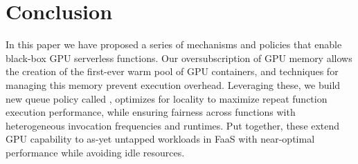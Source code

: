 \begin{comment}

\section{Future Work}

\begin{enumerate}
  \item Integrate more fine-grained GPU compute control~\cite{strati2024orion}.
  Individual kernel launches can be intercepted, and the used number of GPU threads/blocks check and/or modified.
  \item cluster load balancing of GPU invokes
\end{enumerate}

\end{comment}

\section{Conclusion}

In this paper we have proposed a series of mechanisms and policies that enable black-box GPU serverless functions.
Our oversubscription of GPU memory allows the creation of the first-ever warm pool of GPU containers, and techniques for managing this memory prevent execution overhead.
Leveraging these, we build new queue policy called \QName, optimizes for locality to maximize repeat function execution performance, while ensuring fairness across functions with heterogeneous invocation frequencies and runtimes.
Put together, these extend GPU capability to as-yet untapped workloads in FaaS with near-optimal performance while avoiding idle resources.
